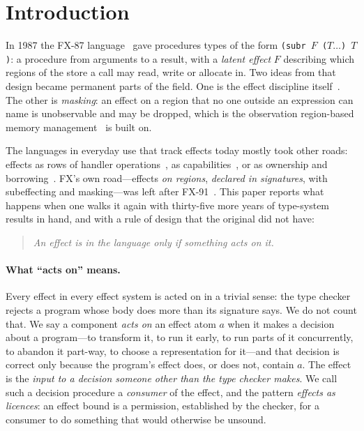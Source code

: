 \documentclass[acmsmall,screen,review]{acmart}
\newcommand{\cd}[1]{\texttt{#1}}
\begin{document}

\maketitle

\section{Introduction}
\label{sec:intro}

In 1987 the FX-87 language~\cite{fx87,lucassen-gifford} gave procedures
types of the form \cd{(subr $F$ ($T \ldots$) $T$)}: a procedure from
arguments to a result, with a \emph{latent effect} $F$ describing which
regions of the store a call may read, write or allocate in. Two ideas
from that design became permanent parts of the field. One is the effect
discipline itself~\cite{talpin-jouvelot}. The other is \emph{masking}:
an effect on a region that no one outside an expression can name is
unobservable and may be dropped, which is the observation region-based
memory management~\cite{tofte-talpin} is built on.

The languages in everyday use that track effects today mostly took
other roads: effects as rows of handler
operations~\cite{koka,plotkin-pretnar,ocaml5}, as
capabilities~\cite{effekt,capturing-types}, or as ownership and
borrowing~\cite{rustbelt}. FX's own road---effects \emph{on regions},
\emph{declared in signatures}, with subeffecting and masking---was left
after FX-91~\cite{fx91}. This paper reports what happens when one walks
it again with thirty-five more years of type-system results in hand, and
with a rule of design that the original did not have:
\begin{quote}
\emph{An effect is in the language only if something acts on it.}
\end{quote}

\paragraph{What ``acts on'' means.} Every effect in every effect system
is acted on in a trivial sense: the type checker rejects a program
whose body does more than its signature says. We do not count that.
We say a component \emph{acts on} an effect atom $a$ when it makes a
decision about a program---to transform it, to run it early, to run
parts of it concurrently, to abandon it part-way, to choose a
representation for it---and that decision is correct only because the
program's effect does, or does not, contain $a$. The effect is the
\emph{input to a decision someone other than the type checker makes}.
We call such a decision procedure a \emph{consumer} of the effect, and
the pattern \emph{effects as licences}: an effect bound is a
permission, established by the checker, for a consumer to do something
that would otherwise be unsound.
\end{document}
